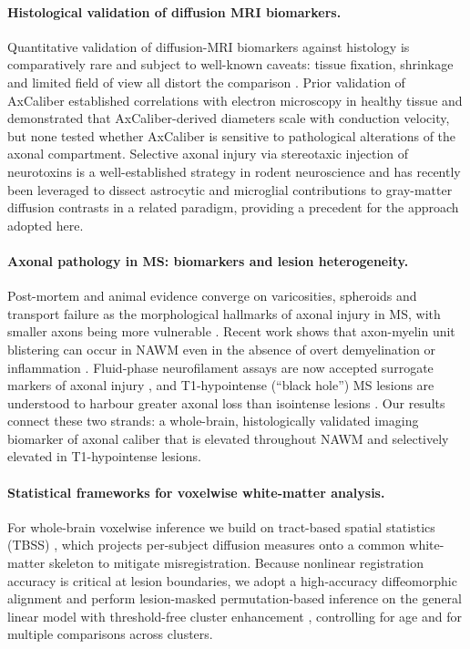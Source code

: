 \paragraph{Histological validation of diffusion MRI biomarkers.}
Quantitative validation of diffusion-MRI biomarkers against histology is comparatively rare and subject to well-known caveats: tissue fixation, shrinkage and limited field of view all distort the comparison \cite{horowitz2015axon}. Prior validation of AxCaliber \cite{barazany2009invivo,horowitz2015axon} established correlations with electron microscopy in healthy tissue and demonstrated that AxCaliber-derived diameters scale with conduction velocity, but none tested whether AxCaliber is sensitive to pathological alterations of the axonal compartment. Selective axonal injury via stereotaxic injection of neurotoxins is a well-established strategy in rodent neuroscience \cite{conforti2014wallerian,adalbert2012intra} and has recently been leveraged to dissect astrocytic and microglial contributions to gray-matter diffusion contrasts in a related paradigm, providing a precedent for the approach adopted here.

\paragraph{Axonal pathology in MS: biomarkers and lesion heterogeneity.}
Post-mortem and animal evidence converge on varicosities, spheroids and transport failure as the morphological hallmarks of axonal injury in MS, with smaller axons being more vulnerable \cite{criste2014axonal,tallantyre2010demyelinated,nikic2011reversible,bergers2002axonal}. Recent work shows that axon-myelin unit blistering can occur in NAWM even in the absence of overt demyelination or inflammation \cite{luchicchi2021axonal,teo2021nilered}. Fluid-phase neurofilament assays are now accepted surrogate markers of axonal injury \cite{petzold2005neurofilament}, and T1-hypointense (``black hole'') MS lesions are understood to harbour greater axonal loss than isointense lesions \cite{vanwaesberghe1999axonal,raz2015relationship}. Our results connect these two strands: a whole-brain, histologically validated imaging biomarker of axonal caliber that is elevated throughout NAWM and selectively elevated in T1-hypointense lesions.

\paragraph{Statistical frameworks for voxelwise white-matter analysis.}
For whole-brain voxelwise inference we build on tract-based spatial statistics (TBSS) \cite{smith2006tbss}, which projects per-subject diffusion measures onto a common white-matter skeleton to mitigate misregistration. Because nonlinear registration accuracy is critical at lesion boundaries, we adopt a high-accuracy diffeomorphic alignment \cite{klein2009evaluation} and perform lesion-masked permutation-based inference on the general linear model with threshold-free cluster enhancement \cite{winkler2014permutation}, controlling for age and for multiple comparisons across clusters.

